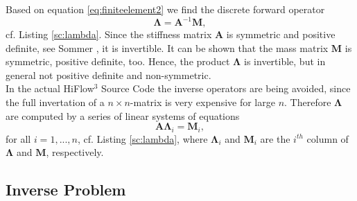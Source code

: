 \documentclass[a4paper, 11pt, twoside]{article}
\begin{document}
%
Based on equation \eqref{eq:finiteelement2} we find the discrete forward operator
%
\begin{equation*}
	\boldsymbol{\Lambda}=\boldsymbol{A}^{-1}\boldsymbol{M},
\end{equation*}
%
cf. Listing \ref{sc:lambda}. Since the stiffness matrix $\boldsymbol{A}$ is symmetric and positive definite, see Sommer \cite{bib:som12}, it is invertible. It can be shown that the mass matrix $\boldsymbol{M}$ is symmetric, positive definite, too. Hence, the product $\boldsymbol{\Lambda}$ is invertible, but in general not positive definite and non-symmetric.\\


In the actual HiFlow$^3$ Source Code the inverse operators are being avoided, since the full invertation of a $n \times n$-matrix is very expensive for large $n$. Therefore $\boldsymbol{\Lambda}$ are computed by a series of linear systems of equations
\[
\boldsymbol{A} \boldsymbol{\Lambda}_i = \boldsymbol{M}_i,
\]
for all $i=1,...,n$, cf. Listing \ref{sc:lambda}, where $\boldsymbol{\Lambda}_i$ and $\boldsymbol{M}_i$ are the $i^{th}$ column of $\boldsymbol{\Lambda}$ and $\boldsymbol{M}$, respectively.

%
%
\subsection{Inverse Problem}\label{sec:invpro}
\end{document}

